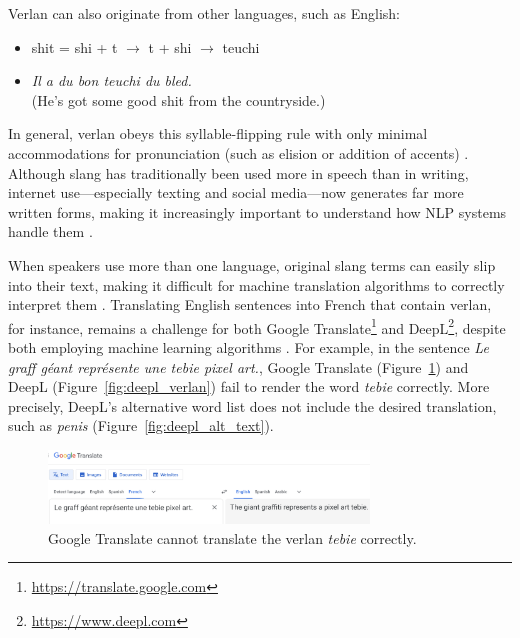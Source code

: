 \documentclass[12pt]{article}
\begin{document}
\noindent Verlan can also originate from other languages, such as English:

\begin{flushleft}
\small
\begin{itemize}
  \item shit = shi + t \(\rightarrow\) t + shi \(\rightarrow\) teuchi \cite{evolutionverlan}
  \item \textit{Il a du bon teuchi du bled.}\\(He's got some good shit from the countryside.)
\end{itemize}
\end{flushleft}

\noindent In general, verlan obeys this syllable-flipping rule with only minimal accommodations for pronunciation (such as elision or addition of accents) \cite{rajabov2025}. Although slang has traditionally been used more in speech than in writing, internet use\;---\;especially texting and social media\;---\;now generates far more written forms, making it increasingly important to understand how NLP systems handle them \cite{rua2005}.

When speakers use more than one language, original slang terms can easily slip into their text, making it difficult for machine translation algorithms to correctly interpret them \cite{hajiyeva2025}. Translating English sentences into French that contain verlan, for instance, remains a challenge for both Google Translate\footnote{\url{https://translate.google.com}} and DeepL\footnote{\url{https://www.deepl.com}}, despite both employing machine learning algorithms \cite{deepl2020, wu2016}. For example, in the sentence \textit{Le graff géant représente une tebie pixel art.}, Google Translate (Figure~\ref{fig:google_verlan}) and DeepL (Figure~\ref{fig:deepl_verlan}) fail to render the word \textit{tebie} correctly. More precisely, DeepL's alternative word list does not include the desired translation, such as \textit{penis} (Figure~\ref{fig:deepl_alt_text}).

\begin{figure}[H]
\centering
\includegraphics[width=0.76\textwidth]{figures/google_verlan.png}
\caption{\label{fig:google_verlan}Google Translate cannot translate the verlan \textit{tebie} correctly.}
\end{figure}
\end{document}
